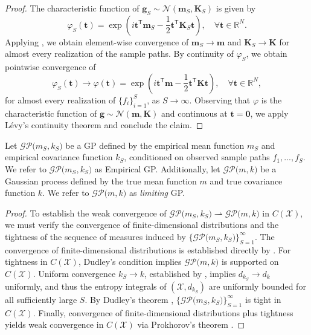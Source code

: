 \documentclass{article}
\newcommand{\K}{S}
\newcommand{\domain}{\mathcal{X}}
\begin{document}
\begin{proof}
The characteristic function of $\mathbf{g}_S \sim \mathcal{N}(\mathbf{m}_S, \mathbf{K}_S)$ is given by
\begin{equation*}
    \varphi_\K(\mathbf{t}) = \exp \left( i \mathbf{t}^{\mathsf{T}} \mathbf{m}_\K - \frac{1}{2} \mathbf{t}^{\mathsf{T}} \mathbf{K}_\K \mathbf{t}  \right), \quad \forall \mathbf{t} \in \mathbb{R}^N.
\end{equation*}
Applying , we obtain element-wise convergence of $\mathbf{m}_S \to \mathbf{m}$ and $\mathbf{K}_\K \to \mathbf{K}$ for almost every realization of the sample paths.
By continuity of $\varphi_\K$, we obtain pointwise convergence of
\begin{equation*}
    \varphi_\K(\mathbf{t}) \to \varphi(\mathbf{t})
    = \exp \left( i \mathbf{t}^{\mathsf{T}} \mathbf{m} - \frac{1}{2} \mathbf{t}^{\mathsf{T}} \mathbf{K} \mathbf{t}  \right), \quad \forall \mathbf{t} \in \mathbb{R}^N,
\end{equation*}
for almost every realization of $\{f_i\}_{i=1}^S$, as $\K \to \infty$.
Observing that $\varphi$ is the characteristic function of $\mathbf{g} \sim \mathcal{N}(\mathbf{m}, \mathbf{K})$ and continuous at $\mathbf{t} = \mathbf{0}$, we apply Lévy's continuity theorem \citep{levy1925} and conclude the claim.
\end{proof}
Let $\mathcal{GP}\bigl(m_\K, k_\K\bigr)$ be a GP defined by the empirical mean function $m_\K$ and empirical covariance function $k_\K$, conditioned on observed sample paths $f_1, ..., f_\K$.
We refer to $\mathcal{GP}\bigl(m_\K, k_\K\bigr)$ as Empirical GP.
Additionally, let $\mathcal{GP}\bigl(m, k)$ be a Gaussian process defined by the true mean function $m$ and true covariance function $k$.
We refer to $\mathcal{GP}\bigl(m, k)$ as \emph{limiting} GP.
\WeakConvergence*
\begin{proof}
To establish the weak convergence of $\mathcal{GP}\bigl(m_\K, k_\K\bigr) \rightharpoonup \mathcal{GP}\bigl(m, k)$ in $C(\domain)$, we must verify the convergence of finite-dimensional distributions and the tightness of the sequence of measures induced by $\{ \mathcal{GP}\bigl(m_\K, k_\K\bigr) \}_{\K=1}^\infty$.
The convergence of finite-dimensional distributions is established directly by .
For tightness in $C(\mathcal X)$, Dudley’s condition implies $\mathcal{GP}\bigl(m, k)$ is supported on $C(\mathcal X)$.
Uniform convergence $k_\K\to k$, established by , implies $d_{k_\K}\to d_k$ uniformly, and thus the entropy integrals of $(\mathcal X,d_{k_\K})$
are uniformly bounded for all sufficiently large $\K$.
By Dudley’s theorem \citep{dudley1967}, $\{ \mathcal{GP}\bigl(m_\K, k_\K\bigr) \}_{S=1}^\infty$ is tight in $C(\mathcal X)$.
Finally, convergence of finite-dimensional distributions plus tightness yields weak convergence in $C(\mathcal X)$ via Prokhorov's theorem \citep{prokhorov1956}.
\end{proof}
\end{document}
